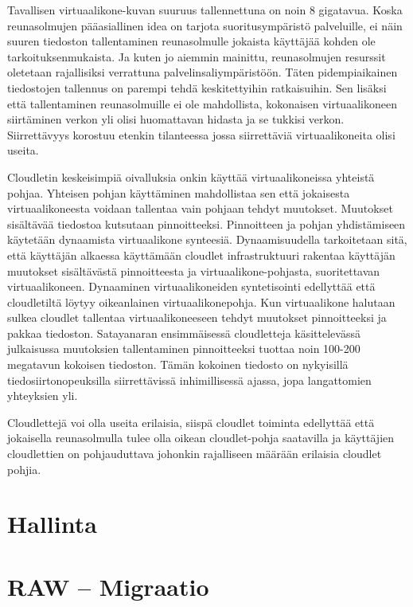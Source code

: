 \documentclass[finnish]{tktltiki2}
\theoremstyle{definition}
\theoremstyle{remark}
\begin{document}
\begin{itemize}
Tavallisen virtuaalikone-kuvan suuruus tallennettuna on noin 8 gigatavua.
Koska reunasolmujen pääasiallinen idea on tarjota suoritusympäristö palveluille,
ei näin suuren tiedoston tallentaminen reunasolmulle jokaista käyttäjää kohden ole tarkoituksenmukaista.
Ja kuten jo aiemmin mainittu, reunasolmujen resurssit oletetaan rajallisiksi verrattuna palvelinsaliympäristöön.
Täten pidempiaikainen tiedostojen tallennus on parempi tehdä keskitettyihin ratkaisuihin.
Sen lisäksi että tallentaminen reunasolmuille ei ole mahdollista, kokonaisen virtuaalikoneen siirtäminen verkon yli olisi huomattavan hidasta ja se tukkisi verkon.
Siirrettävyys korostuu etenkin tilanteessa jossa siirrettäviä virtuaalikoneita olisi useita.

Cloudletin keskeisimpiä oivalluksia onkin käyttää virtuaalikoneissa yhteistä pohjaa. 
Yhteisen pohjan käyttäminen mahdollistaa sen että jokaisesta virtuaalikoneesta voidaan tallentaa vain pohjaan tehdyt muutokset.
Muutokset sisältävää tiedostoa kutsutaan pinnoitteeksi.
Pinnoitteen ja pohjan yhdistämiseen käytetään dynaamista virtuaalikone synteesiä.
Dynaamisuudella tarkoitetaan sitä, että käyttäjän alkaessa käyttämään cloudlet infrastruktuuri rakentaa
käyttäjän muutokset sisältävästä pinnoitteesta ja virtuaalikone-pohjasta, suoritettavan virtuaalikoneen. 
Dynaaminen virtuaalikoneiden syntetisointi edellyttää että cloudletiltä löytyy oikeanlainen virtuaalikonepohja.
Kun virtuaalikone halutaan sulkea cloudlet tallentaa virtuaalikoneeseen tehdyt muutokset pinnoitteeksi ja pakkaa tiedoston. 
Satayanaran ensimmäisessä cloudletteja käsittelevässä julkaisussa \cite{satya09} muutoksien tallentaminen pinnoitteeksi tuottaa noin 100-200 megatavun kokoisen tiedoston. Tämän kokoinen tiedosto on nykyisillä tiedosiirtonopeuksilla siirrettävissä inhimillisessä ajassa, jopa langattomien yhteyksien yli.

Cloudlettejä voi olla useita erilaisia, siispä cloudlet toiminta edellyttää että jokaisella reunasolmulla tulee olla oikean cloudlet-pohja saatavilla ja käyttäjien cloudlettien on pohjauduttava johonkin rajalliseen määrään erilaisia cloudlet pohjia.

\chapter*{Hallinta}

\chapter{RAW – Migraatio}


\end{itemize}
\end{document}
